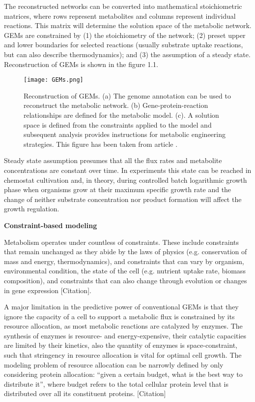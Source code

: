 The reconstructed networks can be converted into mathematical stoichiometric matrices, where rows represent metabolites 
and columns represent individual reactions. This matrix will
determine the solution space of the metabolic network. GEMs are constrained by (1) the stoichiometry of the
network; (2) preset upper and lower boundaries for selected reactions (usually substrate uptake reactions,
but can also describe thermodynamics); and (3) the assumption of a steady state. \cite{Kerkhoven2014} Reconstruction of GEMs is shown in the figure 1.1.

\begin{figure}
    \texttt{[image: GEMs.png]}
    \caption{Reconstruction of GEMs. (a) The genome annotation can be used 
    to reconstruct the metabolic network. (b) Gene-protein-reaction relationships are defined for the metabolic model. 
     (c). A solution space is defined from the constraints applied to the model and subsequent 
    analysis provides instructions for metabolic engineering strategies. This figure has been taken from article \cite{Kerkhoven2014}.}
    \label{GEMs}
\end{figure}

Steady state assumption
presumes that all the flux rates and metabolite concentrations are constant over time. In experiments this state can be
reached in chemostat cultivation and, in theory, during controlled batch logarithmic growth
phase when organisms grow at their maximum specific growth rate and the change of neither substrate concentration 
nor product formation will affect the growth regulation. \cite{Kerkhoven2014} 


\textbf{Constraint-based modeling}

Metabolism operates under countless of constraints. These include constraints that 
remain unchanged as they abide by the laws of physics (e.g. conservation of mass and energy, thermodynamics), 
and constraints that can vary by organism, environmental condition, the state of the 
cell (e.g. nutrient uptake rate, biomass composition), and constraints that can also change through evolution or 
changes in gene expression [Citation]. %

A major limitation in the predictive power of conventional GEMs is that they ignore the capacity of a 
cell to support a metabolic flux is constrained by its resource allocation, as most metabolic reactions are 
catalyzed by enzymes. The synthesis of enzymes is resource- and energy-expensive, their catalytic 
capacities are limited by their kinetics, also the quantity of enzymes is space-constraint, such that 
stringency in resource allocation is vital for optimal cell growth. The modeling problem of resource allocation can 
be narrowly defined by only considering protein allocation: “given a certain budget, what is the best way to distribute 
it”, where budget refers to the total cellular protein level that is distributed over all its constituent proteins. [Citation] %

